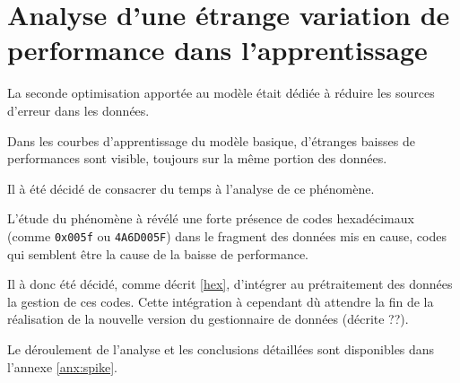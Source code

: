\section{Analyse d'une étrange variation de performance dans l'apprentissage} \label{sec:spike}
La seconde optimisation apportée au modèle était dédiée à réduire les sources d'erreur dans les données.

Dans les courbes d'apprentissage du modèle basique, d'étranges baisses de performances sont visible, toujours sur la même portion des données.

Il à été décidé de consacrer du temps à l'analyse de ce phénomène.

L'étude du phénomène à révélé une forte présence de codes hexadécimaux (comme \lstinline|0x005f| ou \lstinline|4A6D005F|) dans le fragment des données mis en cause, codes qui semblent être la cause de la baisse de performance.

Il à donc été décidé, comme décrit \autoref{hex}, d'intégrer au prétraitement des données la gestion de ces codes.
Cette intégration à cependant dù attendre la fin de la réalisation de la nouvelle version du gestionnaire de données (décrite ??). %

Le déroulement de l'analyse et les conclusions détaillées sont disponibles dans l'annexe \ref{anx:spike}.
